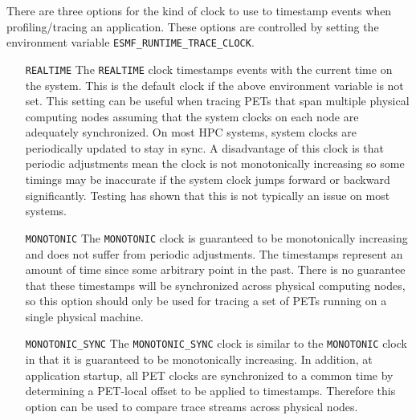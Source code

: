 There are three options for the kind of clock to use to timestamp
events when profiling/tracing an application.
These options are controlled by setting the environment variable
{\tt ESMF\_RUNTIME\_TRACE\_CLOCK}.
\begin{itemize}
\item [{\tt REALTIME}] The {\tt REALTIME} clock timestamps events with the current time on
      the system.  This is the default clock if the above environment
      variable is not set.  This setting can be useful when tracing PETs that
      span multiple physical computing nodes assuming that the system clocks
      on each node are adequately synchronized.  On most HPC systems, system
      clocks are periodically updated to stay in sync.  A disadvantage of this
      clock is that periodic adjustments mean the clock is not monotonically
      increasing so some timings may be inaccurate if the system clock jumps
      forward or backward significantly. Testing has shown that this is not
      typically an issue on most systems.
\item [{\tt MONOTONIC}] The {\tt MONOTONIC} clock is guaranteed to be monotonically increasing
      and does not suffer from periodic adjustments.  The timestamps represent
      an amount of time since some arbitrary point in the past.  There is no
      guarantee that these timestamps will be synchronized across physical
      computing nodes, so this option should only be used for tracing a set of PETs
      running on a single physical machine.
\item [{\tt MONOTONIC\_SYNC}] The {\tt MONOTONIC\_SYNC} clock is similar to the {\tt MONOTONIC} clock
      in that it is guaranteed to be monotonically increasing. In addition, at
      application startup, all PET clocks are synchronized to a common time
      by determining a PET-local offset to be applied to timestamps. Therefore this option
      can be used to compare trace streams across physical nodes.
\end{itemize}
